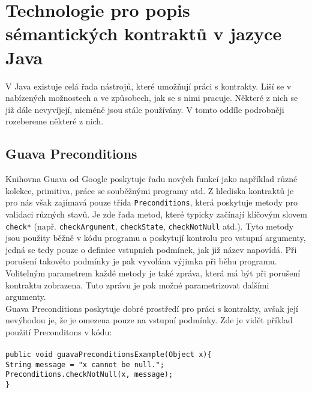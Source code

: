 	\section{Technologie pro popis sémantických kontraktů v jazyce Java}
		V Java existuje celá řada nástrojů, které umožňují práci s kontrakty. Liší se v nabízených možnostech a ve způsobech, jak se s nimi pracuje. Některé z nich se již dále nevyvíjejí, nicméně jsou stále používány. V tomto oddíle podrobněji rozebereme některé z nich.		
	
		\subsection{Guava Preconditions}
			Knihovna Guava \cite{guava} od Google poskytuje řadu nových funkcí jako například různé kolekce, primitiva, práce se souběžnými programy atd. Z hlediska kontraktů je pro nás však zajímavá pouze třída \texttt{Preconditions}, která poskytuje metody pro validaci různých stavů. Je zde řada metod, které typicky začínají klíčovým slovem \texttt{check*} (např. \texttt{checkArgument}, \texttt{checkState}, \texttt{checkNotNull} atd.). Tyto metody jsou použity běžně v kódu programu a poskytují kontrolu pro vstupní argumenty, jedná se tedy pouze o definice vstupních podmínek, jak již název napovídá. Při porušení takovéto podmínky je pak vyvolána výjimka při běhu programu. Volitelným parametrem každé metody je také zpráva, která má být při porušení kontraktu zobrazena. Tuto zprávu je pak možné parametrizovat dalšími argumenty.\\
			
			Guava Preconditions poskytuje dobré prostředí pro práci s kontrakty, avšak její nevýhodou je, že je omezena pouze na vstupní podmínky. Zde je vidět příklad použití Preconditons v kódu:\\\\
			\- \- \- \- \- \texttt{public void guavaPreconditionsExample(Object x)\{}\\
			\- \- \- \- \- \- \- \- \- \- \texttt{String message = "x cannot be null.";}\\ 
        	\- \- \- \- \- \- \- \- \- \- \texttt{Preconditions.checkNotNull(x, message);}\\
    		\- \- \- \- \- \texttt{\}}\\
    		
